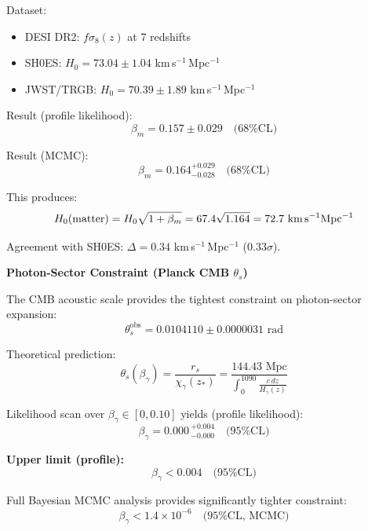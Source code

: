 \documentclass[twocolumn,superscriptaddress,prl,amsmath,amssymb]{revtex4-2}
\begin{document}
Dataset:
\begin{itemize}
\item DESI DR2: $f\sigma_8(z)$ at 7 redshifts~\cite{DESI2024}
\item SH0ES: $H_0 = 73.04 \pm 1.04$ km\,s$^{-1}$\,Mpc$^{-1}$~\cite{Riess2022}
\item JWST/TRGB: $H_0 = 70.39 \pm 1.89$ km\,s$^{-1}$\,Mpc$^{-1}$~\cite{Freedman2024}
\end{itemize}

Result (profile likelihood):
\begin{equation}
\beta_m = 0.157 \pm 0.029 \quad \text{(68\% CL)}
\end{equation}

Result (MCMC):
\begin{equation}
\beta_m = 0.164^{+0.029}_{-0.028} \quad \text{(68\% CL)}
\end{equation}

This produces:
\begin{equation}
H_0(\text{matter}) = H_0 \sqrt{1 + \beta_m} = 67.4\sqrt{1.164} = 72.7 \text{ km\,s}^{-1}\text{Mpc}^{-1}
\end{equation}

Agreement with SH0ES: $\Delta = 0.34$ km\,s$^{-1}$\,Mpc$^{-1}$ ($0.33\sigma$).

\textbf{Photon-Sector Constraint (Planck CMB $\theta_s$)}

The CMB acoustic scale provides the tightest constraint on photon-sector expansion:
\begin{equation}
\theta_s^{\text{obs}} = 0.0104110 \pm 0.0000031 \text{ rad}
\end{equation}

Theoretical prediction:
\begin{equation}
\theta_s(\beta_\gamma) = \frac{r_s}{\chi_\gamma(z_*)} = \frac{144.43 \text{ Mpc}}{\int_0^{1090} \frac{c\,dz}{H_\gamma(z)}}
\end{equation}

Likelihood scan over $\beta_\gamma \in [0, 0.10]$ yields (profile likelihood):
\begin{equation}
\beta_\gamma = 0.000\,^{+0.004}_{-0.000} \quad \text{(95\% CL)}
\end{equation}

\textbf{Upper limit (profile):}
\begin{equation}
\beta_\gamma < 0.004 \quad \text{(95\% CL)}
\end{equation}

Full Bayesian MCMC analysis provides significantly tighter constraint:
\begin{equation}
\beta_\gamma < 1.4 \times 10^{-6} \quad \text{(95\% CL, MCMC)}
\end{equation}
\end{document}
